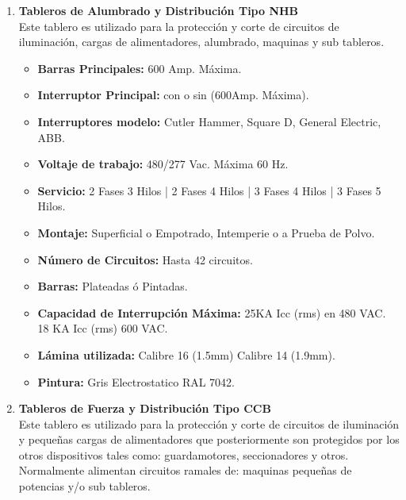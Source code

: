 \documentclass[11pt,letterpaper]{article}
\begin{document}
\begin{enumerate}
	\item \textbf{Tableros de Alumbrado y Distribución Tipo NHB}\\
		Este tablero es utilizado para la protección y corte de circuitos de iluminación, cargas de alimentadores, alumbrado, maquinas y sub tableros.
		\begin{itemize}
			\item \textbf{Barras Principales:} 600 Amp. Máxima.
			\item \textbf{Interruptor Principal:} con o sin (600Amp. Máxima).
			\item \textbf{Interruptores modelo:} Cutler Hammer, Square D, General Electric, ABB.
			\item \textbf{Voltaje de trabajo:} 480/277 Vac. Máxima 60 Hz.
			\item \textbf{Servicio:} 2 Fases 3 Hilos | 2 Fases 4 Hilos | 3 Fases 4 Hilos | 3 Fases 5 Hilos.
			\item \textbf{Montaje:} Superficial o Empotrado, Intemperie o a Prueba de Polvo.
			\item \textbf{Número de Circuitos:} Hasta 42 circuitos.
			\item \textbf{Barras:} Plateadas ó Pintadas.
			\item \textbf{Capacidad de Interrupción Máxima:} 25KA Icc (rms) en 480 VAC. 18 KA Icc (rms) 600 VAC.
			\item \textbf{Lámina utilizada:} Calibre 16 (1.5mm) Calibre 14 (1.9mm).
			\item \textbf{Pintura:} Gris Electrostatico RAL 7042.
		\end{itemize}
	
	\item \textbf{Tableros de Fuerza y Distribución Tipo CCB}\\
		Este tablero es utilizado para la protección y corte de circuitos de iluminación y pequeñas cargas de alimentadores que posteriormente son protegidos por los otros dispositivos tales como: guardamotores, seccionadores y otros. Normalmente  alimentan circuitos ramales de: maquinas pequeñas de potencias y/o sub tableros.
		

\end{enumerate}
\end{document}
